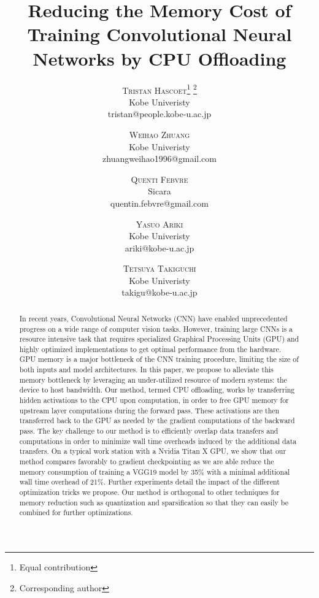 \documentclass[11pt,onecolumn]{article}
\title{Reducing the Memory Cost of Training Convolutional Neural Networks by CPU Offloading} %
\author{%
	\textsc{Tristan Hascoet}\thanks{Equal contribution} \thanks{Corresponding author} \\ %
	\normalsize Kobe Univeristy \\ %
	\normalsize tristan@people.kobe-u.ac.jp %
	\and %
	\textsc{Weihao Zhuang}\footnotemark[1] \\ %
	\normalsize Kobe Univeristy \\ %
	\normalsize zhuangweihao1996@gmail.com %
	\and %
	\textsc{Quenti Febvre} \\ %
    \normalsize Sicara \\ %
    \normalsize quentin.febvre@gmail.com  %
    \and %
    \textsc{Yasuo Ariki} \\ %
    \normalsize Kobe Univeristy \\ %
	\normalsize ariki@kobe-u.ac.jp %
	\and %
    \textsc{Tetsuya Takiguchi} \\ %
    \normalsize Kobe Univeristy \\ %
	\normalsize takigu@kobe-u.ac.jp %
}
\date{\vspace{-1ex}}
\begin{document}
	
\maketitle
	
\begin{abstract}

In recent years, Convolutional Neural Networks (CNN) have enabled 
unprecedented progress on a wide range of computer vision tasks. 
However, training large CNNs is a resource intensive task that requires 
specialized Graphical Processing Units (GPU) and highly optimized 
implementations to get optimal performance from the hardware. 
GPU memory is a major bottleneck of the CNN training procedure,
 limiting  the size of both inputs and model architectures.
In this paper, we propose to alleviate this memory bottleneck by 
leveraging an under-utilized resource of modern systems: 
the device to host bandwidth.
Our method, termed CPU offloading, works by transferring hidden activations to the CPU upon
computation, in order to free GPU memory for upstream layer computations during the forward pass. 
These activations are then transferred back to the GPU as needed by the gradient computations of the backward pass.
The key challenge to our method is to efficiently overlap data transfers and computations
in order to minimize  wall time overheads induced by the additional data transfers.
On a typical work station with a Nvidia Titan X GPU, 
we show that our method compares favorably to 
gradient checkpointing as we are able reduce the memory consumption of training a VGG19 model by 35\% with a minimal additional wall time overhead of 21\%. 
Further experiments detail the impact of the different optimization tricks we propose.
Our method is orthogonal to other techniques for memory reduction such as 
quantization and sparsification so that they can easily be combined for further optimizations.

\end{abstract}
\end{document}
